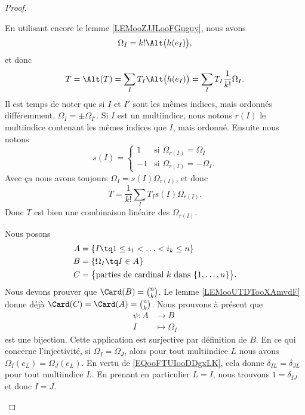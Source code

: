 \begin{proof}
\begin{subproof}
		En utilisant encore le lemme \ref{LEMooZJJLooFGuguy}, nous avons
		\begin{equation}
			\Omega_I=k!\Alt\big( h(e_I) \big),
		\end{equation}
		et donc
		\begin{equation}
			T=\Alt(T)=\sum_IT_I\Alt\big( h(e_I) \big)=\sum_IT_I\frac{1}{ k!}\Omega_I.
		\end{equation}
		Il est temps de noter que si \( I\) et \( I'\) sont les mêmes indices, mais ordonnés différemment, \( \Omega_{I}=\pm \Omega_{I'}\). Si \( I\) est un multiindice, nous notons \( r(I)\) le multiindice contenant les mêmes indices que \( I\), mais ordonné. Ensuite nous notons
		\begin{equation}
			s(I)=\begin{cases}
				1  & \text{si } \Omega_{r(I)}=\Omega_I   \\
				-1 & \text{si } \Omega_{r(I)}=-\Omega_I.
			\end{cases}
		\end{equation}
		Avec ça nous avons toujours \( \Omega_I=s(I)\Omega_{r(I)}\), et donc
		\begin{equation}
			T=\frac{1}{ k!}\sum_IT_Is(I)\Omega_{r(I)}.
		\end{equation}
		Donc \( T\) est bien une combinaison linéaire des \( \Omega_{r(I)}\).


		\spitem[Cardinal]
		Nous posons
		\begin{subequations}
			\begin{align}
				A & =\{ I\tq 1\leq i_1<\ldots <i_k\leq n \}                                      \\
				B & =\{ \Omega_I\tq I\in A \}                                                    \\
				C & =\big\{ \text{parties de cardinal \( k\) dans \( \{ 1,\ldots,n \}\)} \big\}.
			\end{align}
		\end{subequations}
		Nous devons prouver que \( \Card(B)=\binom{n}{k}\). Le lemme \ref{LEMooUTDTooXAmvdF} donne déjà \( \Card(C)=\Card(A)=\binom{ n }{ k }\). Nous prouvons à présent que
		\begin{equation}
			\begin{aligned}
				\psi\colon A & \to B            \\
				I            & \mapsto \Omega_I
			\end{aligned}
		\end{equation}
		est une bijection. Cette application est surjective par définition de \( B\). En ce qui concerne l'injectivité, si \( \Omega_I=\Omega_J\), alors pour tout multiindice \( L\) nous avons \( \Omega_I(e_L)=\Omega_J(e_L)\). En vertu de \eqref{EQooFTUIooDDgxLK}, cela donne \( \delta_{IL}=\delta_{JL}\) pour tout multiindice \( L\). En prenant en particulier \( L=I\), nous trouvons \( 1=\delta_{IJ}\) et donc \( I=J\).

	\end{subproof}

\end{proof}



